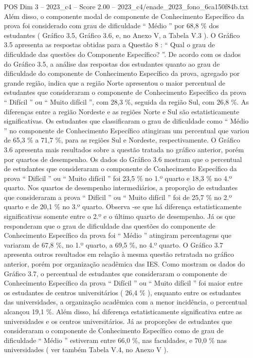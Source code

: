 \begin{textsample}{POS Dim 3 – 2023\_c4 – Score 2.00 – 2023\_c4/enade\_2023\_fono\_6ca150f84b.txt}
Além disso, o componente modal de componente de Conhecimento Específico da prova foi considerado com grau de dificuldade “ Médio ” por 68,8 \% dos estudantes ( Gráfico 3.5, Gráfico 3.6, e, no Anexo V, a Tabela V.3 ).
O Gráfico 3.5 apresenta as respostas obtidas para a Questão 8 : “ Qual o grau de dificuldade das questões do Componente Específico? ”.
De acordo com os dados do Gráfico 3.5, a análise das respostas dos estudantes quanto ao grau de dificuldade do componente de Conhecimento Específico da prova, agregado por grande região, indica que a região Norte apresentou o maior percentual de estudantes que consideraram o componente de Conhecimento Específico da prova “ Difícil ” ou “ Muito difícil ”, com 28,3 \%, seguida da região Sul, com 26,8 \%.
As diferenças entre a região Nordeste e as regiões Norte e Sul são estatisticamente significativas.
Os estudantes que classificaram o grau de dificuldade como “ Médio ” no componente de Conhecimento Específico atingiram um percentual que variou de 65,3 \% a 71,7 \%, para as regiões Sul e Nordeste, respectivamente.
O Gráfico 3.6 apresenta mais resultados sobre a questão tratada no gráfico anterior, porém por quartos de desempenho.
Os dados do Gráfico 3.6 mostram que o percentual de estudantes que consideraram o componente de Conhecimento Específico da prova “ Difícil ” ou “ Muito difícil ” foi 23,5 \% no 1.º quarto e 18,3 \% no 4.º quarto.
Nos quartos de desempenho intermediários, a proporção de estudantes que consideraram a prova “ Difícil ” ou “ Muito difícil ” foi de 25,7 \% no 2.º quarto e de 20,1 \% no 3.º quarto.
Observa -se que há diferença estatisticamente significativas somente entre o 2.º e o último quarto de desempenho.
Já os que responderam que o grau de dificuldade das questões do componente de Conhecimento Específico da prova foi “ Médio ” atingiram percentagens que variaram de 67,8 \%, no 1.º quarto, a 69,5 \%, no 4.º quarto.
O Gráfico 3.7 apresenta outros resultados em relação à mesma questão retratada no gráfico anterior, porém por organização acadêmica das IES.
Como mostram os dados do Gráfico 3.7, o percentual de estudantes que consideraram o componente de Conhecimento Específico da prova “ Difícil ” ou “ Muito difícil ” foi maior entre os estudantes de centros universitários ( 26,4 \% ), enquanto entre os estudantes das universidades, a organização acadêmica com a menor incidência, o percentual alcançou 19,1 \%.
Além disso, há diferença estatisticamente significativa entre as universidades e os centros universitários.
Já as proporções de estudantes que consideraram o componente de Conhecimento Específico como de grau de dificuldade “ Médio ” estiveram entre 66,0 \%, nas faculdades, e 70,0 \% nas universidades ( ver também Tabela V.4, no Anexo V ).

\end{textsample}
